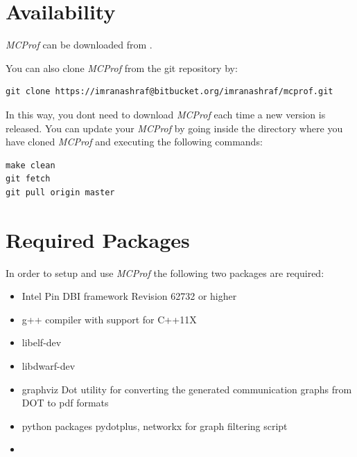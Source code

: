 \documentclass[10pt]{article}
\newcommand{\MCPROF}{\emph{MCProf}}
\begin{document}
\section{Availability}
\label{sec:availability}

\MCPROF{} can be downloaded from \cite{mcprofDownload}.

You can also clone \MCPROF{} from the git repository by:

{
\small
\begin{Verbatim}[frame=single, samepage=true]
git clone https://imranashraf@bitbucket.org/imranashraf/mcprof.git
\end{Verbatim}
}

In this way, you dont need to download \MCPROF{} each time a new version is released.
You can update your \MCPROF{} by going inside the directory where you have cloned \MCPROF{}
and executing the following commands:

{
\small
\begin{Verbatim}[frame=single, samepage=true]
make clean
git fetch
git pull origin master
\end{Verbatim}
}


\section{Required Packages}
\label{sec:reqPackages}

In order to setup and use \MCPROF{} the following two packages are required:

\begin{itemize}

\item Intel Pin DBI framework \cite{Pin_Download} Revision 62732 or higher

\item g++ compiler with support for C++11X

\item libelf-dev

\item libdwarf-dev

\item graphviz Dot utility for converting the generated communication graphs
    from DOT to pdf formats

\item python packages pydotplus, networkx for graph filtering script

\item 

\end{itemize}
\end{document}
